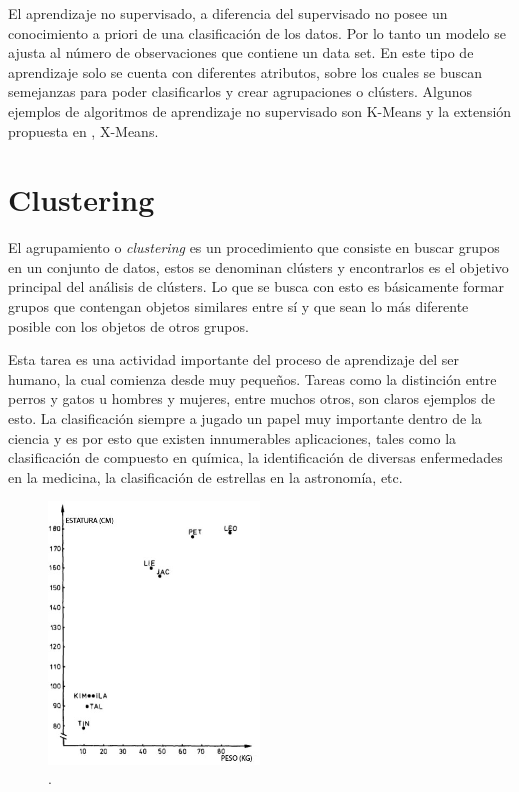 El aprendizaje no supervisado, a diferencia del supervisado no posee un conocimiento a priori de una clasificación de los datos. Por lo tanto un modelo se ajusta al número de observaciones que contiene un data set. En este tipo de aprendizaje solo se cuenta con diferentes atributos, sobre los cuales se buscan semejanzas para poder clasificarlos y crear agrupaciones o clústers. Algunos ejemplos de algoritmos de aprendizaje no supervisado son K-Means y la extensión propuesta en \cite{Pelleg00x-means:extending}, X-Means.

\section{Clustering}

El agrupamiento o \textit{clustering} \cite{clusteranalysis} es un procedimiento que consiste en buscar grupos en un conjunto de datos, estos se denominan clústers y encontrarlos es el objetivo principal del análisis de clústers. Lo que se busca con esto es básicamente formar grupos que contengan objetos similares entre sí y que sean lo más diferente posible con los objetos de otros grupos.

Esta tarea es una actividad importante del proceso de aprendizaje del ser humano, la cual comienza desde muy pequeños. Tareas como la distinción entre perros y gatos u hombres y mujeres, entre muchos otros, son claros ejemplos de esto. La clasificación siempre a jugado un papel muy importante dentro de la ciencia y es por esto que existen innumerables aplicaciones, tales como la clasificación de compuesto en química, la identificación de diversas enfermedades en la medicina, la clasificación de estrellas en la astronomía, etc.

\begin{figure}[H]
    \centering
    \includegraphics[width=0.5\textwidth]{images/clustering_example.jpg}
    \caption{.}
    \label{fig:clustering_example}
\end{figure}

